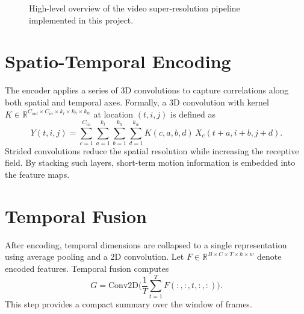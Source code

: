 \documentclass{article}
\begin{document}
\begin{figure}[h]
\centering
{}
\caption{High-level overview of the video super-resolution pipeline implemented in this project.}
\label{fig:architecture}
\end{figure}

\section{Spatio-Temporal Encoding}
The encoder applies a series of 3D convolutions to capture correlations along both spatial and temporal axes. Formally, a 3D convolution with kernel $K \in \mathbb{R}^{C_{out}\times C_{in}\times k_t\times k_h\times k_w}$ at location $(t,i,j)$ is defined as
\begin{equation}
Y(t,i,j) = \sum_{c=1}^{C_{in}} \sum_{a=1}^{k_t} \sum_{b=1}^{k_h} \sum_{d=1}^{k_w} K(c,a,b,d) \, X_{c}(t+a,i+b,j+d).
\end{equation}
Strided convolutions reduce the spatial resolution while increasing the receptive field. By stacking such layers, short-term motion information is embedded into the feature maps.

\section{Temporal Fusion}
After encoding, temporal dimensions are collapsed to a single representation using average pooling and a 2D convolution. Let $F \in \mathbb{R}^{B\times C\times T\times h\times w}$ denote encoded features. Temporal fusion computes
\begin{equation}
G = \mathrm{Conv2D}\big(\frac{1}{T} \sum_{t=1}^{T} F(:, :, t, :, :)\big).
\end{equation}
This step provides a compact summary over the window of frames.
\end{document}
